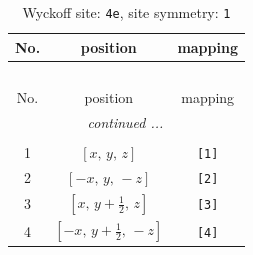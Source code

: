 \documentclass[fleqn,8pt]{jsarticle}
\begin{document}
\begin{longtable}{ccc}
\caption{Wyckoff site: {\tt 4e}, site symmetry: {\tt 1}}
 \\
 \hline \hline
No. & position & mapping \\ \hline \endfirsthead

\multicolumn{2}{l}{\tablename\ \thetable{}} \\
 \hline \hline
No. & position & mapping \\ \hline \endhead

 \hline \hline
\multicolumn{2}{r}{\footnotesize\it continued ...} \\ \endfoot

 \hline \hline
\multicolumn{2}{r}{} \\ \endlastfoot

1 & $\left[ x,\, y,\, z \right]$ & {\tt [1]} \\ \hline
2 & $\left[ - x,\, y,\, - z \right]$ & {\tt [2]} \\ \hline
3 & $\left[ x,\, y + \frac{1}{2},\, z \right]$ & {\tt [3]} \\ \hline
4 & $\left[ - x,\, y + \frac{1}{2},\, - z \right]$ & {\tt [4]} \\
\end{longtable}
\end{document}
